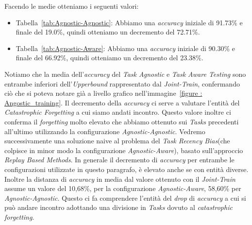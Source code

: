 \newline
Facendo le medie otteniamo i seguenti valori:
\begin{itemize}
    \item Tabella~\ref{tab:Agnostic-Agnostic}: Abbiamo una \textit{accuracy} iniziale di 91.73\% e finale del 19.0\%, quindi otteniamo un decremento del 72.71\%.
    \item Tabella~\ref{tab:Agnostic-Aware}: Abbiamo una \textit{accuracy} iniziale di 90.30\% e finale del 66.92\%, quindi otteniamo un decremento del 23.38\%.
\end{itemize}
Notiamo che la media dell'\textit{accuracy} del \textit{Task Agnostic} e \textit{Task Aware Testing} sono entrambe inferiori dell'\textit{Upperbound} rappresentato dal \textit{Joint-Train}, confermando ciò che si poteva notare già a livello grafico nell'immagine~\ref{figure : Angostic_training}.
Il decremento della \textit{accuracy} ci serve a valutare l'entità del \textit{Catastrophic Forgetting} a cui siamo andati incontro.
\newline
Questo valore inoltre ci conferma il \textit{forgetting} molto elevato che abbiamo ottenuto sui \textit{Tasks} precedenti all'ultimo  utilizzando la configurazione \textit{Agnostic-Agnostic}. Vedremo successivamente una soluzione naive al problema del \textit{Task Recency Bias}(che colpisce in minor modo la configurazione \textit{Agnostic-Aware}), basato sull'approccio \textit{Replay Based Methods}.
\newline
In generale il decremento di \textit{accuracy} per entrambe le configurazioni utilizzate in questo paragrafo, è elevato anche se con entità diverse. Inoltre la distanza di \textit{accuracy} in media dal valore ottenuto con il \textit{Joint-Train} assume un valore del 10,68\%, per la configurazione \textit{Agnostic-Aware}, 58,60\% per \textit{Agnostic-Agnostic}. Questo ci fa comprendere l'entità del \textit{drop} di \textit{accuracy} a cui si può andare incontro adottando una divisione in \textit{Tasks} dovuto al \textit{catastrophic forgetting}.

